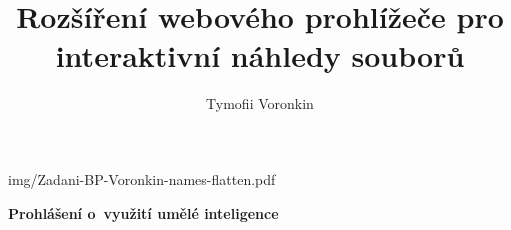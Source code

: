 \documentclass[a4paper,12pt]{article}
\author{Tymofii Voronkin}				%
\title{Rozšíření webového prohlížeče pro interaktivní náhledy souborů}			%
\begin{document}

\titulniStrana							%


\pagestyle{plain}

\clearpage
    
\label{assignment}

{img/Zadani-BP-Voronkin-names-flatten.pdf}


\generujProhlaseni						%

\clearpage
\vspace*{\fill}
\noindent\textbf{Prohlášení o~využití umělé inteligence}\\[1em]
\textProhlaseniAI
\vspace{2cm}

\generujPodekovani						%
\generujAnotaci							%
\generujAnnotation						%
\generujObsah							%
\generujSeznamObrazku					%


\seznamZkratek							%
\end{document}
